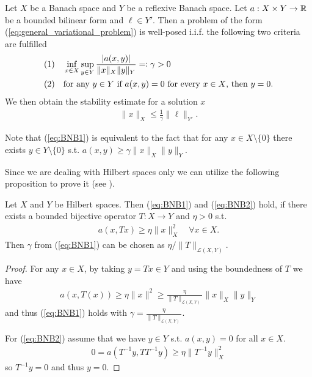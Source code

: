 \documentclass[../master_thesis.tex]{subfiles}
\begin{document}
\begin{theorem}[BNB]\label{thm:BNB}
    Let $X$ be a Banach space and $Y$ be a reflexive Banach space. Let $a:X\times Y \rightarrow \mathbb{R}$ be a 
    bounded bilinear form and $\ell \in Y'$. Then a problem of the form 
    (\ref{eq:general_variational_problem}) is well-posed i.i.f. the following two criteria are fulfilled
    \begin{align}
        &\text{\normalfont(1)}\quad\inf_{x \in X} \sup_{y\in Y} \frac{|a(x,y)|}{\lVert x \rVert _X \lVert y \rVert _Y} 
            =\vcentcolon \gamma > 0\label{eq:BNB1} 
        \\&\text{\normalfont(2)}\quad \text{for any $y \in Y$ if $a(x,y) = 0$ for every $x \in X$, then $y=0$.}\label{eq:BNB2}
    \end{align}    
    We then obtain the stability estimate for a solution $x$
    \begin{align*}
        \lVert x \rVert _X \leq \frac{1}{\gamma} \lVert \ell\rVert _{Y'}.
    \end{align*}
\end{theorem}
Note that (\ref{eq:BNB1}) is equivalent to the fact that for any $x \in X \setminus\{0\}$ 
there exists $y \in Y\setminus\{0\}$ s.t. $a(x,y) \geq \gamma \lVert x \rVert _X \lVert y \rVert _Y$.  

Since we are dealing with Hilbert spaces only we can utilize the following proposition to prove it 
(see \cite[Rem.\,25.14]{ern_guermond}).
\begin{proposition}[$T$-coercivity]\label{prop:T_coercivity}
    Let $X$ and $Y$ be Hilbert spaces. Then {\normalfont (\ref{eq:BNB1})} and {\normalfont (\ref{eq:BNB2})} hold, if
    there exists a bounded bijective operator $T:X \rightarrow Y$ and $\eta >0$ s.t.
    \begin{align}
        a(x,Tx) \geq \eta \lVert x \rVert _X^2 \quad \forall x \in X. \label{eq:T_coercivity_bound}
    \end{align}
    Then $\gamma$ from {\normalfont (\ref{eq:BNB1})} can be chosen as $\eta/\lVert T \rVert  _{\mathcal{L}(X,Y)}$.
\end{proposition}
\begin{proof}
    For any $x \in X$, by taking $y = Tx \in Y$ and using the boundedness of 
    $T$ we have 
    \begin{align*}
        a(x,T(x)) \geq \eta \lVert x \rVert ^2 \geq \frac{\eta}{\lVert T \rVert  _{\mathcal{L}(X,Y)}}
            \lVert x \rVert _X \lVert y \rVert _Y
    \end{align*}
    and thus (\ref{eq:BNB1}) holds with $\gamma =  \frac{\eta}{\lVert T \rVert  _{\mathcal{L}(X,Y)}}$.

    For (\ref{eq:BNB2}) assume that we have $y \in Y$ s.t. $a(x,y) = 0$ for all 
    $x \in X$. 
    \begin{align*}
        0 = a(T^{-1}y,T T^{-1}y) \geq \eta \lVert T^{-1}y \rVert^2 _X
    \end{align*}
    so $T^{-1}y = 0$ and thus $y = 0$.
\end{proof}
\end{document}
